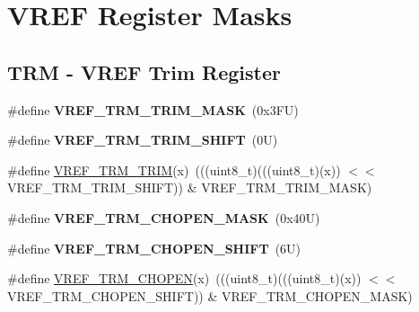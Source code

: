 \hypertarget{group___v_r_e_f___register___masks}{}\section{V\+R\+EF Register Masks}
\label{group___v_r_e_f___register___masks}
\subsection*{T\+RM -\/ V\+R\+EF Trim Register}
\begin{DoxyCompactItemize}
\item 
\mbox{\label{group___v_r_e_f___register___masks_gaf233ddf56401003ec721b808d3910978}} 
\#define {\bfseries V\+R\+E\+F\+\_\+\+T\+R\+M\+\_\+\+T\+R\+I\+M\+\_\+\+M\+A\+SK}~(0x3\+F\+U)
\item 
\mbox{\label{group___v_r_e_f___register___masks_ga7738b4edb18c8c9dcb36d6be564c80e6}} 
\#define {\bfseries V\+R\+E\+F\+\_\+\+T\+R\+M\+\_\+\+T\+R\+I\+M\+\_\+\+S\+H\+I\+FT}~(0\+U)
\item 
\#define \mbox{\hyperlink{group___v_r_e_f___register___masks_ga7b200f282af693ea614c6bb380a5bfb8}{V\+R\+E\+F\+\_\+\+T\+R\+M\+\_\+\+T\+R\+IM}}(x)~(((uint8\+\_\+t)(((uint8\+\_\+t)(x)) $<$$<$ V\+R\+E\+F\+\_\+\+T\+R\+M\+\_\+\+T\+R\+I\+M\+\_\+\+S\+H\+I\+FT)) \& V\+R\+E\+F\+\_\+\+T\+R\+M\+\_\+\+T\+R\+I\+M\+\_\+\+M\+A\+SK)
\item 
\mbox{\label{group___v_r_e_f___register___masks_gaca90564d0247d6637d487fa045dbe328}} 
\#define {\bfseries V\+R\+E\+F\+\_\+\+T\+R\+M\+\_\+\+C\+H\+O\+P\+E\+N\+\_\+\+M\+A\+SK}~(0x40\+U)
\item 
\mbox{\label{group___v_r_e_f___register___masks_gad66c35e7a2372a16a0ef1042ad0d029a}} 
\#define {\bfseries V\+R\+E\+F\+\_\+\+T\+R\+M\+\_\+\+C\+H\+O\+P\+E\+N\+\_\+\+S\+H\+I\+FT}~(6\+U)
\item 
\#define \mbox{\hyperlink{group___v_r_e_f___register___masks_gaaa2d50a050e401275bb8db441075a60c}{V\+R\+E\+F\+\_\+\+T\+R\+M\+\_\+\+C\+H\+O\+P\+EN}}(x)~(((uint8\+\_\+t)(((uint8\+\_\+t)(x)) $<$$<$ V\+R\+E\+F\+\_\+\+T\+R\+M\+\_\+\+C\+H\+O\+P\+E\+N\+\_\+\+S\+H\+I\+FT)) \& V\+R\+E\+F\+\_\+\+T\+R\+M\+\_\+\+C\+H\+O\+P\+E\+N\+\_\+\+M\+A\+SK)
\end{DoxyCompactItemize}
